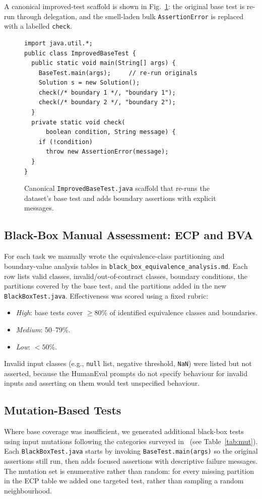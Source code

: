 \documentclass[journal]{IEEEtran}
\begin{document}
A canonical improved-test scaffold is shown in
Fig.~\ref{fig:improved}: the original base test is re-run
through delegation, and the smell-laden bulk
\texttt{AssertionError} is replaced with a labelled
\texttt{check}.

\begin{figure}[!t]
\begin{lstlisting}
import java.util.*;
public class ImprovedBaseTest {
  public static void main(String[] args) {
    BaseTest.main(args);     // re-run originals
    Solution s = new Solution();
    check(/* boundary 1 */, "boundary 1");
    check(/* boundary 2 */, "boundary 2");
  }
  private static void check(
      boolean condition, String message) {
    if (!condition)
      throw new AssertionError(message);
  }
}
\end{lstlisting}
\caption{Canonical \texttt{ImprovedBaseTest.java} scaffold
that re-runs the dataset's base test and adds boundary
assertions with explicit messages.}
\label{fig:improved}
\end{figure}

\subsection{Black-Box Manual Assessment: ECP and BVA}
For each task we manually wrote the equivalence-class
partitioning and boundary-value analysis tables in
\texttt{black\_box\_equivalence\_analysis.md}. Each row lists
valid classes, invalid/out-of-contract classes, boundary
conditions, the partitions covered by the base test, and the
partitions added in the new \texttt{BlackBoxTest.java}.
Effectiveness was scored using a fixed rubric:
\begin{itemize}
    \item \emph{High}: base tests cover $\geq 80\%$ of
    identified equivalence classes and boundaries.
    \item \emph{Medium}: 50--79\%.
    \item \emph{Low}: $<50\%$.
\end{itemize}
Invalid input classes (e.g., \texttt{null} list, negative
threshold, \texttt{NaN}) were listed but not asserted, because
the HumanEval prompts do not specify behaviour for invalid
inputs and asserting on them would test unspecified
behaviour.

\subsection{Mutation-Based Tests}
\label{sec:mutations}
Where base coverage was insufficient, we generated additional
black-box tests using input mutations following the categories
surveyed in~\cite{liu2023evalplus} (see Table~\ref{tab:mut}).
Each \texttt{BlackBoxTest.java} starts by invoking
\texttt{BaseTest.main(args)} so the original assertions still
run, then adds focused assertions with descriptive failure
messages. The mutation set is enumerative rather than random:
for every missing partition in the ECP table we added one
targeted test, rather than sampling a random neighbourhood.
\end{document}
